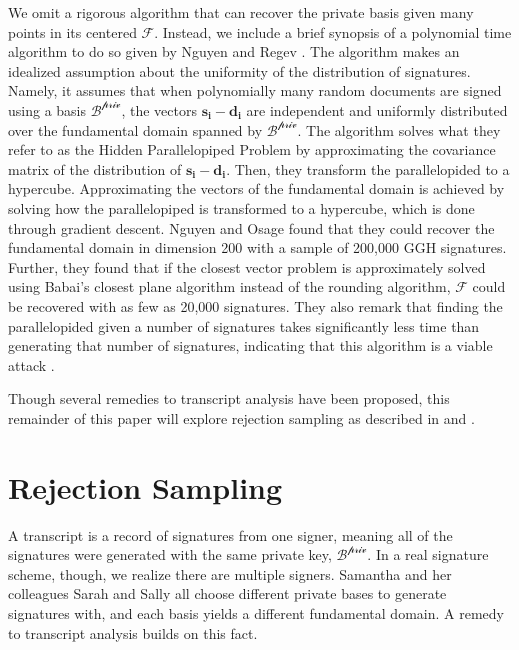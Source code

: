 \documentclass[11pt,reqno]{amsart}
\theoremstyle{definition}
\begin{document}
We omit a rigorous algorithm that can recover the private basis given many points in its centered $\mathcal{F}$. Instead, we include a brief synopsis of a polynomial time algorithm to do so given by Nguyen and Regev \cite{nguyen-regev}. The algorithm makes an idealized assumption about the uniformity of the distribution of signatures. Namely, it assumes that when polynomially many random documents are signed using a basis $\mathcal{B^{\text{priv}}}$, the vectors $\mathbf{s_i - d_i}$ are independent and uniformly distributed over the fundamental domain spanned by $\mathcal{B^{\text{priv}}}$. The algorithm solves what they refer to as the Hidden Parallelopiped Problem by approximating the covariance matrix of the distribution of $\mathbf{s_i - d_i}$. Then, they transform the parallelopided to a hypercube. Approximating the vectors of the fundamental domain is achieved by solving how the parallelopiped is transformed to a hypercube, which is done through gradient descent. Nguyen and Osage \cite{nguyen-regev} found that they could recover the fundamental domain in dimension 200 with a sample of 200,000 GGH signatures. Further, they found that if the closest vector problem is approximately solved using Babai's closest plane algorithm \cite[Exercise 7.53]{textbook} instead of the rounding algorithm, $\mathcal{F}$ could be recovered with as few as 20,000 signatures. They also remark that finding the parallelopided given a number of signatures takes significantly less time than generating that number of signatures, indicating that this algorithm is a viable attack \cite{nguyen-regev}. 

Though several remedies to transcript analysis have been proposed, this remainder of this paper will explore rejection sampling as described in \cite{presentation} and \cite{lubshevky}. 

\section{Rejection Sampling}
\label{rejs}

 A transcript is a record of signatures from one signer, meaning all of the signatures were generated with the same private key, $\mathcal{B^{\text{priv}}}$. In a real signature scheme, though, we realize there are multiple signers. Samantha and her colleagues Sarah and Sally all choose different private bases to generate signatures with, and each basis yields a different fundamental domain. A remedy to transcript analysis builds on this fact.
\end{document}
